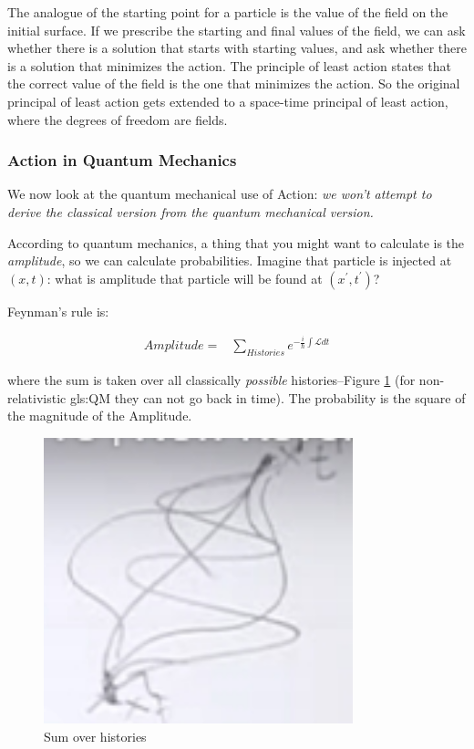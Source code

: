 \documentclass[]{article}
\begin{document}
The analogue of the starting point for a particle is the value of the field on the initial surface. If we prescribe the starting and final values of the field, we can ask whether there is a solution that starts with starting values, and ask whether there is a solution that minimizes the action. The principle of least action states that the correct value of the field is the one that minimizes the action. So the original principal of least action gets extended to a space-time principal of least action, where the degrees of freedom are fields. 

\subsubsection{Action in Quantum Mechanics}

We now look at the quantum mechanical use of Action: \emph{we won't attempt to derive the classical version from the quantum mechanical version.}

According to quantum mechanics, a thing that you might want to calculate is the \emph{amplitude}, so we can calculate probabilities. Imagine that particle is injected at $(x,t)$: what is amplitude that particle will be found at $(x^\prime,t^\prime)$?

Feynman's rule is:

\begin{align*}
	Amplitude =& \sum_{Histories} e^{-\frac{i}{\hslash} \int \mathcal{L} dt}
\end{align*}

where the sum is taken over all classically \emph{possible} histories--Figure \ref{fig:sum:histories} (for non-relativistic \glsdesc{gls:QM} they can not go back in time). The probability is the square of the magnitude of the Amplitude.

\begin{figure}[H]
	\caption{Sum over histories}\label{fig:sum:histories}
	\includegraphics[width=0.8\textwidth]{sum-histories}
\end{figure}
\end{document}

